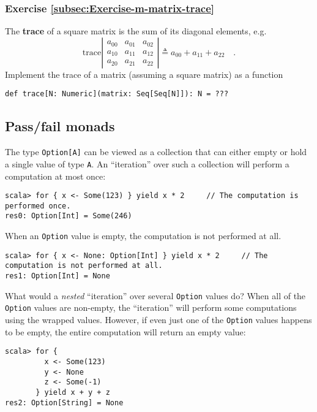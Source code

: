 \subsubsection{Exercise \label{subsec:Exercise-m-matrix-trace}\ref{subsec:Exercise-m-matrix-trace}}

The \textbf{trace} of a square matrix is
the sum of its diagonal elements, e.g.
\[
\text{trace}\left|\begin{array}{ccc}
a_{00} & a_{01} & a_{02}\\
a_{10} & a_{11} & a_{12}\\
a_{20} & a_{21} & a_{22}
\end{array}\right|\triangleq a_{00}+a_{11}+a_{22}\quad.
\]
Implement the trace of a matrix (assuming a square matrix) as a function
\begin{lstlisting}
def trace[N: Numeric](matrix: Seq[Seq[N]]): N = ???
\end{lstlisting}


\subsection{Pass/fail monads}

The type \lstinline!Option[A]! can be viewed as a collection that
can either empty or hold a single value of type \lstinline!A!. An
\textsf{``}iteration\textsf{''} over such a collection will perform a computation
at most once:
\begin{lstlisting}
scala> for { x <- Some(123) } yield x * 2     // The computation is performed once.
res0: Option[Int] = Some(246) 
\end{lstlisting}
When an \lstinline!Option! value is empty, the computation is not
performed at all.
\begin{lstlisting}
scala> for { x <- None: Option[Int] } yield x * 2     // The computation is not performed at all.
res1: Option[Int] = None
\end{lstlisting}
What would a \emph{nested} \textsf{``}iteration\textsf{''} over several \lstinline!Option!
values do? When all of the \lstinline!Option! values are non-empty,
the \textsf{``}iteration\textsf{''} will perform some computations using the wrapped
values. However, if even just one of the \lstinline!Option! values
happens to be empty, the entire computation will return an empty value:
\begin{lstlisting}
scala> for {
         x <- Some(123)
         y <- None
         z <- Some(-1)
       } yield x + y + z
res2: Option[String] = None
\end{lstlisting}

